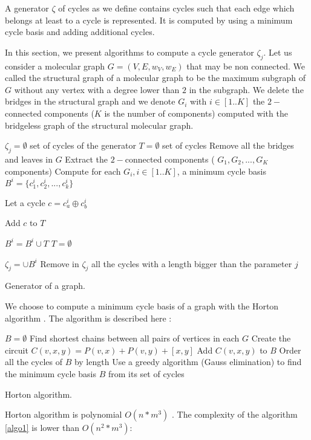 \documentclass[journal=jacsat,manuscript=article]{achemso}
\begin{document}
A generator $\zeta$ of cycles as we define contains cycles such that each edge which belongs at least to a cycle is represented. It is computed by using a minimum cycle basis and adding additional cycles.

In this section, we present algorithms to compute a cycle generator $\zeta_j$. Let us consider a molecular graph $G=(V,E,w_V,w_E)$ that may be non connected. We called the structural graph of a molecular graph to be the maximum subgraph of $G$ without any vertex with a degree lower than $2$ in the subgraph. We delete the bridges in the structural graph and we denote $G_i$ with $ i \in [1..K]$ the $2-$connected components ($K$ is the number of components) computed with the bridgeless graph of the structural molecular graph.
\begin{algorithm}[H]
\label{algo1}
\SetAlgoLined
{}

$\zeta_j= \emptyset $ set of cycles of the generator\;
$T = \emptyset $ set of cycles\;
Remove all the bridges and leaves in $G$ \;
Extract the $2-$connected components ( $G_1,G_2,...,G_K$ components)\;
Compute for each $G_i, i \in [1..K]$, a minimum cycle basis $B^i =\{c^i_1,c_2^i,...,c_k^i  \}$  \;
 {
 	{
 	Let  a cycle $ c =  c_a^i \oplus c_b^i$\;
 	
 	{
 	Add $c$ to $T$\;
 	}
 	}
 	
 	$B^i = B^i \cup T$ \;
 	$T = \emptyset $ \;
 }

 $\zeta_j = \cup B^i$ \;
 Remove in $\zeta_j$ all the cycles with a length bigger than the parameter $j$\;

\caption{Generator of a graph.}

\end{algorithm}
\vspace{0.5cm}

We choose to compute a minimum cycle basis of a graph with the Horton algorithm \cite{Horton1987}. The algorithm is described here : 

\vspace{0.3cm}
\begin{algorithm}[H]
\label{algo2}
\SetAlgoLined
{}
$B= \emptyset $\;
 Find shortest chains between all pairs  of vertices in each $G$\;
	{Create the circuit $C(v,x,y) = P( v,x) + P(v,y) +[ x, y]$\;
	{ Add $C(v,x,y)$ to $B$\;
	}
	}
 Order all the cycles of  $B$ by length\;
 Use a greedy algorithm (Gauss elimination) to find the minimum cycle basis $B$ from its set of cycles\;

\caption{Horton algorithm.}

\end{algorithm}
Horton algorithm is polynomial  $O(n*m^{3})$ \cite{Horton1987}. The complexity of the algorithm \ref{algo1} is lower than $O(n^2*m^{3})$:
\end{document}
